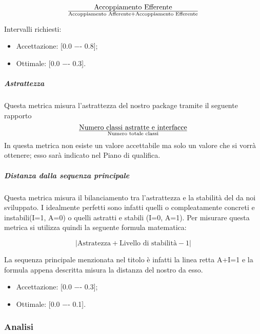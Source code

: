\begin{displaymath}
{\text{Accoppiamento Efferente}}\over{\text{Accoppiamento Afferente} + \text{Accoppiamento Efferente}}
\end{displaymath}

Intervalli richiesti:
\begin{itemize}
\item
Accettazione: [0.0 −- 0.8];
\item
Ottimale: [0.0 −- 0.3].
\end{itemize}

\subparagraph{Astrattezza}
Questa metrica misura l'astrattezza del nostro package tramite il seguente rapporto 
\begin{displaymath}
{\text{Numero classi astratte e interfacce}}\over{\text{Numero totale classi}}
\end{displaymath}
In questa metrica non esiste un valore accettabile ma solo un valore che si vorrà ottenere; esso sarà indicato nel Piano di qualifica.
\subparagraph{Distanza dalla sequenza principale}
Questa metrica misura il bilanciamento tra l'astrattezza e la stabilità del  da noi sviluppato. I  idealmente perfetti sono infatti quelli o compleatamente concreti e instabili(I=1, A=0) o quelli astratti e stabili (I=0, A=1). Per misurare questa metrica si utilizza quindi la seguente formula matematica:

\begin{displaymath}
{|\text{Astratezza} + \text{Livello di stabilità} - 1|}
\end{displaymath}

La sequenza principale menzionata nel titolo è infatti la linea retta A+I=1 e la formula appena descritta misura la distanza del nostro  da esso.
\begin{itemize}
\item
Accettazione: [0.0 −- 0.3];
\item
Ottimale: [0.0 −- 0.1].
\end{itemize}


\subsubsection{Analisi}

